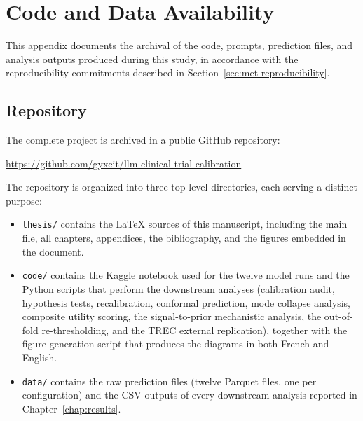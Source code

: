 
\chapter{Code and Data Availability}
\label{app:code}

This appendix documents the archival of the code, prompts, prediction 
files, and analysis outputs produced during this study, in accordance 
with the reproducibility commitments described in 
Section~\ref{sec:met-reproducibility}.

\section{Repository}
\label{sec:app-repo}

The complete project is archived in a public GitHub repository:

\begin{center}
    \url{https://github.com/gyxcit/llm-clinical-trial-calibration}
\end{center}

The repository is organized into three top-level directories, each 
serving a distinct purpose:

\begin{itemize}
    \item \texttt{thesis/} contains the \LaTeX{} sources of this 
    manuscript, including the main file, all chapters, appendices, 
    the bibliography, and the figures embedded in the document.
    \item \texttt{code/} contains the Kaggle notebook used for the 
    twelve model runs and the Python scripts that perform the 
    downstream analyses (calibration audit, hypothesis tests, 
    recalibration, conformal prediction, mode collapse analysis, 
    composite utility scoring, the signal-to-prior mechanistic 
    analysis, the out-of-fold re-thresholding, and the TREC external 
    replication), together with the figure-generation script that 
    produces the diagrams in both French and English.
    \item \texttt{data/} contains the raw prediction files (twelve 
    Parquet files, one per configuration) and the CSV outputs of 
    every downstream analysis reported in Chapter~\ref{chap:results}.
\end{itemize}


